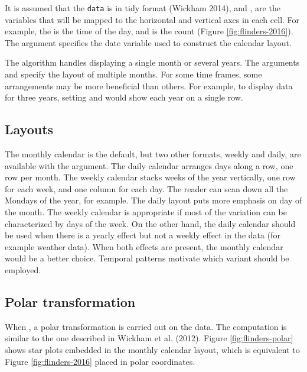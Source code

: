 It is assumed that the \texttt{data} is in tidy format (Wickham 2014),
and ,  are the variables that will be mapped to the
horizontal and vertical axes in each cell. For example, the  is
the time of the day, and  is the count (Figure
\ref{fig:flinders-2016}). The  argument specifies the date
variable used to construct the calendar layout.

The algorithm handles displaying a single month or several years. The
arguments  and  specify the layout of multiple
months. For some time frames, some arrangements may be more beneficial
than others. For example, to display data for three years, setting
 and  would show each year on a single
row.

\hypertarget{layouts}{%
\subsection{Layouts}\label{layouts}}

The monthly calendar is the default, but two other formats, weekly and
daily, are available with the  argument. The daily
calendar arranges days along a row, one row per month. The weekly
calendar stacks weeks of the year vertically, one row for each week, and
one column for each day. The reader can scan down all the Mondays of the
year, for example. The daily layout puts more emphasis on day of the
month. The weekly calendar is appropriate if most of the variation can
be characterized by days of the week. On the other hand, the daily
calendar should be used when there is a yearly effect but not a weekly
effect in the data (for example weather data). When both effects are
present, the monthly calendar would be a better choice. Temporal
patterns motivate which variant should be employed.

\hypertarget{polar-transformation}{%
\subsection{Polar transformation}\label{polar-transformation}}

When , a polar transformation is carried out on the
data. The computation is similar to the one described in Wickham et al.
(2012). Figure \ref{fig:flinders-polar} shows star plots embedded in the
monthly calendar layout, which is equivalent to Figure
\ref{fig:flinders-2016} placed in polar coordinates.

